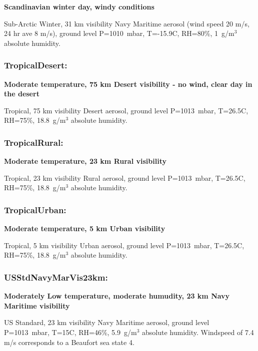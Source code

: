 \documentclass{workpackage}
\begin{document}
\textbf{Scandinavian winter day, windy conditions}

Sub-Arctic Winter, 31 km visibility  Navy Maritime aerosol (wind speed 20 m/s, 24 hr ave 8 m/s), ground level P=1010~mbar, T=-15.9C, RH=80\%, 1~g/m$^3$ absolute humidity.

\subsubsection{TropicalDesert:}
\label{sec:TropicalDesert}

\textbf{Moderate temperature, 75 km Desert visibility - no wind, clear day in the desert}

Tropical, 75 km visibility  Desert aerosol, ground level P=1013~mbar, T=26.5C, RH=75\%, 18.8~g/m$^3$ absolute humidity.

\subsubsection{TropicalRural:}
\label{sec:TropicalRural}

\textbf{Moderate temperature, 23 km Rural visibility}

Tropical, 23 km visibility  Rural aerosol, ground level P=1013~mbar, T=26.5C, RH=75\%, 18.8~g/m$^3$ absolute humidity.

\subsubsection{TropicalUrban:}
\label{sec:TropicalUrban}

\textbf{Moderate temperature, 5 km Urban visibility}

Tropical, 5 km visibility  Urban aerosol, ground level P=1013~mbar, T=26.5C, RH=75\%, 18.8~g/m$^3$ absolute humidity.

\subsubsection{USStdNavyMarVis23km:}
\label{sec:USStdNavyMarVis23km}

\textbf{Moderately Low temperature, moderate humudity, 23 km Navy Maritime visibility}

US Standard, 23 km visibility  Navy Maritime aerosol, ground level P=1013~mbar, T=15C, RH=46\%, 5.9~g/m$^3$ absolute humidity.  Windspeed of 7.4 m/s corresponds to a Beaufort sea state 4.


\end{document}
